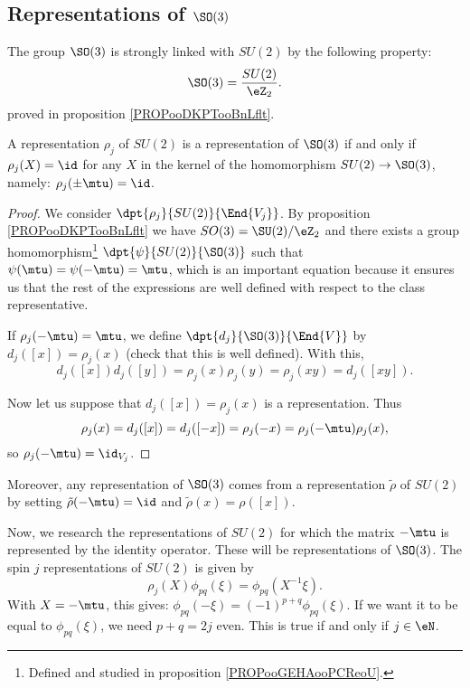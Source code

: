 \subsection{Representations of \texorpdfstring{$\SO(3)$}{SO3}}

The group $\SO(3)$ is strongly linked with $SU(2)$ by the following property:
\begin{equation}
   \SO(3)=\frac{SU(2)}{\eZ_2}.
\end{equation}
proved in proposition \ref{PROPooDKPTooBnLflt}.

\begin{lemma}\label{lem:SO_3}
    A representation $\rho_j$ of $SU(2)$ is a representation of $\SO(3)$ if and only if $\rho_j(X)=\id$ for any $X$ in the kernel of the homomorphism $SU(2)\to \SO(3)$, namely: $\rho_j(\pm\mtu)=\id$.
\end{lemma}

\begin{proof}
    We consider $\dpt{\rho_j}{SU(2)}{\End{V_j}}$. By proposition \ref{PROPooDKPTooBnLflt} we have \( SO(3)=\SU(2)/\eZ_2\) and there exists a group homomorphism\footnote{Defined and studied in proposition \ref{PROPooGEHAooPCReoU}.} $\dpt{\psi}{SU(2)}{\SO(3)}$ such that $\psi(\mtu)=\psi(-\mtu)=\mtu$, which is an important equation because it ensures us that the rest of the expressions are well defined with respect to the class representative.

    If $\rho_j(-\mtu)=\mtu$, we define $\dpt{d_j}{\SO(3)}{\End{V}}$ by $d_j([x])=\rho_j(x)$ (check that this is well defined). With this,
    \[
      d_j([x])d_j([y])=\rho_j(x)\rho_j(y)=\rho_j(xy)=d_j([xy]).
    \]

    Now let us suppose that $d_j([x])=\rho_j(x)$ is a representation. Thus
    \[
      \rho_j(x)=d_j([x])=d_j([-x])=\rho_j(-x)=\rho_j(-\mtu)\rho_j(x),
    \]
    so $\rho_j(-\mtu)=\id_{V_j}$.
\end{proof}

Moreover, any representation of $\SO(3)$ comes from a representation $\tilde\rho$ of $SU(2)$ by setting $\tilde\rho(-\mtu)=\id$ and $\tilde\rho(x)=\rho([x])$.

Now, we research the representations of $SU(2)$ for which the matrix $-\mtu$ is represented by the identity operator. These will be representations of $\SO(3)$. The spin $j$ representations of $SU(2)$ is given by
\[
   \rho_j(X)\phi_{pq}(\xi)=\phi_{pq}(X^{-1}\xi).
\]
With $X=-\mtu$, this gives: $\phi_{pq}(-\xi)=(-1)^{p+q}\phi_{pq}(\xi)$. If we want it to be equal to $\phi_{pq}(\xi)$, we need $p+q=2j$ even. This is true if and only if $j\in\eN$.


